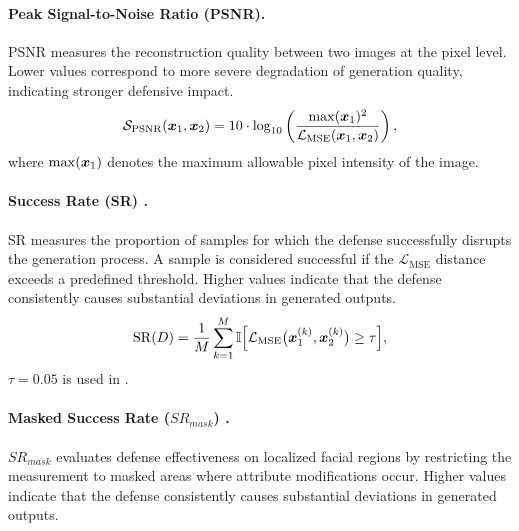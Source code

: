 \documentclass{article}
\begin{document}
\paragraph{Peak Signal-to-Noise Ratio (PSNR).}
PSNR measures the reconstruction quality between two images at the pixel level. Lower values correspond to more severe degradation of generation quality, indicating stronger defensive impact.
\begin{equation}
{\mathcal{S}}_\mathrm{PSNR}({\bm{x}}_1,{\bm{x}}_2) = 10 \cdot \log_{10} \left( \frac{\max({\bm{x}}_1)^2}{\mathcal{L}_\mathrm{MSE}({\bm{x}}_1,{\bm{x}}_2)} \right),
\label{eq:psnr}
\end{equation}
\noindent where $\max({\bm{x}}_1)$ denotes the maximum allowable pixel intensity of the image.

\paragraph{Success Rate (SR) .}
SR measures the proportion of samples for which the defense successfully disrupts the generation process. A sample is considered successful if the $\mathcal{L}_\mathrm{MSE}$ distance exceeds a predefined threshold. %
Higher values indicate that the defense consistently causes substantial deviations in generated outputs.
\begin{equation}
\mathrm{SR}(D) = \frac{1}{M} \sum_{k=1}^{M} \mathbb{I} \Big[\mathcal{L}_\mathrm{MSE} \big({\bm{x}}_1^{(k)}, {\bm{x}}_2^{(k)} \big) \ge \tau \Big],
\label{eq:sr}
\end{equation}
\noindent $\tau = 0.05$ is used in \cite{ruiz2020disrupting}.

\paragraph{Masked Success Rate ($SR_{mask}$) .}
$SR_{mask}$ evaluates defense effectiveness on localized facial regions by restricting the measurement to masked areas where attribute modifications occur. Higher values indicate that the defense consistently causes substantial deviations in generated outputs.
\end{document}
